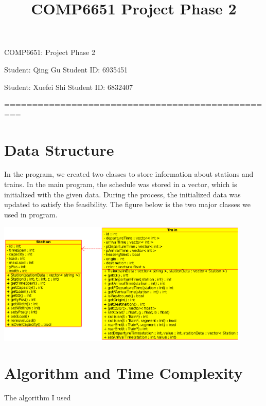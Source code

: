 \documentclass[letterpaper, 12pt, titlepage]{article}
\begin{document}
\title{COMP6651 Project Phase 2}
\setcounter{tocdepth}{2}
\newpage
\begin{center}
    {\huge COMP6651: Project Phase 2}


    \vspace{2cm}
    Student: Qing Gu  \hspace{5cm}
    Student ID: 6935451
   
    Student: Xuefei Shi  \hspace{5cm}
    Student ID: 6832407
\vspace{1cm}
    \vspace{1cm}

    =================================================
\end{center}

\section{Data Structure}
In the program, we created two classes to store information about stations and trains. In the main program, the schedule was stored in a vector, which is initialized with the given data. During the process, the initialized data was updated to satisfy the feasibility. The figure below is the two major classes we used in program.
\begin{center}
    \small
    \centering
    \includegraphics[width=12cm]{class.ps}
    \label{uml}
\end{center}

\section{Algorithm and Time Complexity}
The algorithm I used 
\end{document}

